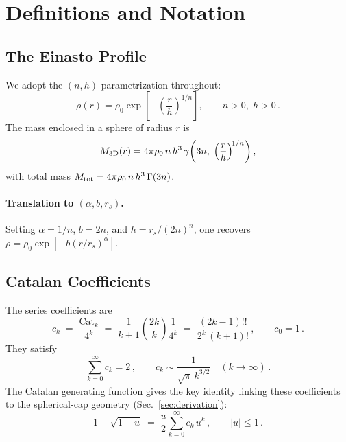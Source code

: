 \documentclass{article}
\begin{document}
\section{Definitions and Notation}
\label{sec:defs}

\subsection{The Einasto Profile}

We adopt the $(n,h)$ parametrization throughout:
\begin{equation}\label{eq:einasto}
\rho(r) = \rho_0 \exp\!\left[-\left(\frac{r}{h}\right)^{\!1/n}\right],
\qquad n>0,\; h>0\,.
\end{equation}
The mass enclosed in a sphere of radius $r$ is
\begin{equation}\label{eq:M3D}
M_{\rm 3D}(r) = 4\pi \rho_0\, n\, h^3\,
\gamma\!\left(3n,\;\left(\frac{r}{h}\right)^{\!1/n}\right),
\end{equation}
with total mass $M_{\rm tot} = 4\pi \rho_0\, n\, h^3\,\Gamma(3n)$.

\paragraph{Translation to $(\alpha, b, r_s)$.}
Setting $\alpha = 1/n$, $b = 2n$, and $h = r_s/(2n)^n$, one recovers
$\rho = \rho_0\exp[-b(r/r_s)^\alpha]$.

\subsection{Catalan Coefficients}
\label{sec:catalan}

The series coefficients are
\begin{equation}\label{eq:ck}
\boxed{\;
c_k \;=\; \frac{\mathrm{Cat}_k}{4^k}
    \;=\; \frac{1}{k+1}\binom{2k}{k}\frac{1}{4^k}
    \;=\; \frac{(2k-1)!!}{2^k\,(k+1)!}\,,
\qquad c_0=1\,.\;}
\end{equation}
They satisfy
\begin{equation}\label{eq:ck-properties}
\sum_{k=0}^{\infty} c_k = 2\,,
\qquad
c_k \sim \frac{1}{\sqrt{\pi}\,k^{3/2}} \quad (k\to\infty)\,.
\end{equation}
The Catalan generating function gives the key identity linking these
coefficients to the spherical-cap geometry (Sec.~\ref{sec:derivation}):
\begin{equation}\label{eq:catalan-gf}
1-\sqrt{1-u} \;=\; \frac{u}{2}\sum_{k=0}^{\infty} c_k\, u^k\,,
\qquad |u|\le 1\,.
\end{equation}
\end{document}
